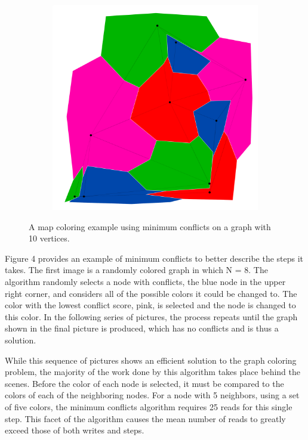 \documentclass{article}
\begin{document}
\begin{figure}[h!]
\begin{subfigure}{0.18\textwidth}
				\caption{}
				\label{mind}
			\end{subfigure}
			\;
			\begin{subfigure}{0.18\textwidth}
				\centering
				\includegraphics[width=\textwidth]{images/sequences/min/minconf_I00007}
				\caption{}
				\label{mine}
			\end{subfigure} 

			\caption{A map coloring example using minimum conflicts on a graph with 10 vertices.}
			\label{min_ex}
		\end{figure}

		Figure 4 provides an example of minimum conflicts to better describe the steps it takes.  The first image is a randomly colored graph in which N = 8.  The algorithm randomly selects a node with conflicts, the blue node in the upper right corner, and considers all of the possible colors it could be changed to.  The color with the lowest conflict score, pink, is selected and the node is changed to this color.  In the following series of pictures, the process repeats until the graph shown in the final picture is produced, which has no conflicts and is thus a solution.
		
		While this sequence of pictures shows an efficient solution to the graph coloring problem, the majority of the work done by this algorithm takes place behind the scenes.  Before the color of each node is selected, it must be compared to the colors of each of the neighboring nodes.  For a node with 5 neighbors, using a set of five colors, the minimum conflicts algorithm requires 25 reads for this single step.  This facet of the algorithm causes the mean number of reads to greatly exceed those of both writes and steps.
\end{document}
